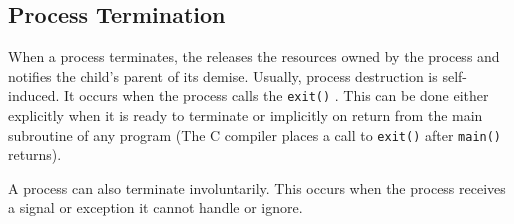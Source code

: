 \subsection{Process Termination}\label{subsec:Process_Termination}
When a process terminates, the  releases the resources owned by the process and notifies the child’s parent of its demise.
Usually, process destruction is self-induced.
It occurs when the process calls the \texttt{exit()} .
This can be done either explicitly when it is ready to terminate or implicitly on return from the main subroutine of any program (The C compiler places a call to \texttt{exit()} after \texttt{main()} returns).

A process can also terminate involuntarily.
This occurs when the process receives a signal or exception it cannot handle or ignore.

